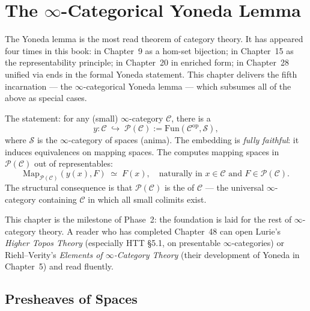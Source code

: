 
\chapter{The $\infty$-Categorical Yoneda Lemma}

\begin{overviewbox}
The Yoneda lemma is the most read theorem of category theory. It has
appeared four times in this book: in Chapter~9 as a hom-set bijection;
in Chapter~15 as the representability principle; in Chapter~20 in
enriched form; in Chapter~28 unified via ends in the formal Yoneda
statement. This chapter delivers the fifth incarnation — the
$\infty$-categorical Yoneda lemma — which subsumes all of the above as
special cases.

The statement: for any (small) $\infty$-category $\mathcal{C}$, there is
a 
\begin{equation*}
  y : \mathcal{C} \;\hookrightarrow\; \mathcal{P}(\mathcal{C}) := \mathrm{Fun}(\mathcal{C}^{\mathrm{op}}, \mathcal{S}),
\end{equation*}
where $\mathcal{S}$ is the $\infty$-category of spaces (anima). The
embedding is \emph{fully faithful}: it induces equivalences on mapping
spaces. The  computes mapping spaces in
$\mathcal{P}(\mathcal{C})$ out of representables:
\begin{equation*}
  \mathrm{Map}_{\mathcal{P}(\mathcal{C})}(y(x), F) \;\simeq\; F(x), \quad \text{naturally in } x \in \mathcal{C} \text{ and } F \in \mathcal{P}(\mathcal{C}).
\end{equation*}
The structural consequence is that $\mathcal{P}(\mathcal{C})$ is the
 of $\mathcal{C}$ — the universal $\infty$-category
containing $\mathcal{C}$ in which all small colimits exist.

This chapter is the milestone of Phase~2: the foundation is laid for
the rest of $\infty$-category theory. A reader who has completed
Chapter~48 can open Lurie's \emph{Higher Topos Theory} (especially HTT
§5.1, on presentable $\infty$-categories) or Riehl–Verity's
\emph{Elements of $\infty$-Category Theory} (their development of Yoneda
in Chapter~5) and read fluently.
\end{overviewbox}


\section{Presheaves of Spaces}
\label{sec:presheaves-of-spaces}


